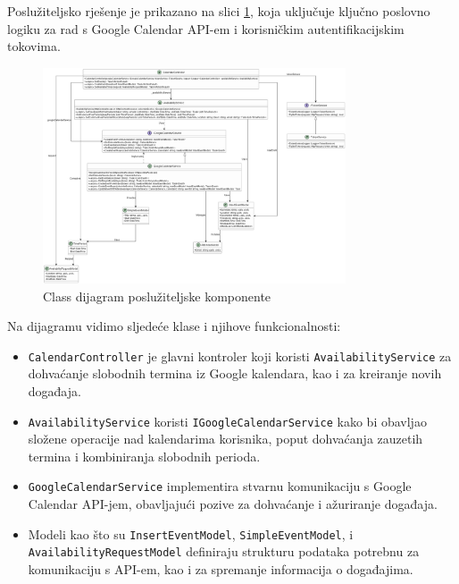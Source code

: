 \documentclass{foi}
\begin{document}
Poslužiteljsko rješenje je prikazano na slici \ref{fig:backend-uml}, koja uključuje ključno poslovno logiku za rad s Google Calendar API-em i korisničkim autentifikacijskim tokovima.

\begin{figure}[H]
    \centering
    \includegraphics[width=0.8\textwidth]{slike/MeetingPlannerAPI_ClassUML.png}
    \caption{Class dijagram poslužiteljske komponente}
    \label{fig:backend-uml}
\end{figure}

Na dijagramu vidimo sljedeće klase i njihove funkcionalnosti:
\begin{itemize}
    \item \texttt{CalendarController} je glavni kontroler koji koristi \texttt{AvailabilityService} za dohvaćanje slobodnih termina iz Google kalendara, kao i za kreiranje novih događaja.
    \item \texttt{AvailabilityService} koristi \texttt{IGoogleCalendarService} kako bi obavljao složene operacije nad kalendarima korisnika, poput dohvaćanja zauzetih termina i kombiniranja slobodnih perioda.
    \item \texttt{GoogleCalendarService} implementira stvarnu komunikaciju s Google Calendar API-jem, obavljajući pozive za dohvaćanje i ažuriranje događaja.
    \item Modeli kao što su \texttt{InsertEventModel}, \texttt{SimpleEventModel}, i \texttt{AvailabilityRequestModel} definiraju strukturu podataka potrebnu za komunikaciju s API-em, kao i za spremanje informacija o događajima.
\end{itemize}
\end{document}
